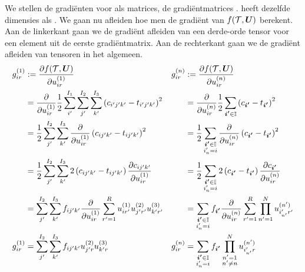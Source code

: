 We stellen de gradi\"enten voor als matrices, de gradi\"entmatrices \GGG{}. \GGG{} heeft dezelfde dimensies als \UUU{}. We gaan nu afleiden hoe men de gradi\"ent van $f(\mathcal{T}, \boldsymbol{U})$ berekent. Aan de linkerkant gaan we de gradi\"ent afleiden van een derde-orde tensor voor een element uit de eerste gradi\"entmatrix. Aan de rechterkant gaan we de gradi\"ent afleiden van tensoren in het algemeen.
\begin{align*}
	g^{(1)}_{ir} 	&:= \frac{\partial f(\T, \mUUU)}{\partial u^{(1)}_{ir}} &
    g^{(n)}_{ir} 	&:= \frac{\partial f(\T, \mUUU)}{\partial u^{(n)}_{ir}}\\
%    
					&=\frac{\partial}{\partial u^{(1)}_{ir}} \frac{1}{2}\sum_{i'}^{I_1}\sum_{j'}^{I_2}\sum_{k'}^{I_3}\left(c_{i'j'k'} - t_{i'j'k'} \right)^2 &
					&=\frac{\partial}{\partial u^{(n)}_{ir}} \frac{1}{2}\sum_{\iii{} \in \I}\left(c_{\iii{}} - t_{\iii{}} \right)^2\\
%					
					&= \frac{1}{2} \sum_{j'}^{I_2}\sum_{k'}^{I_3} \frac{\partial}{\partial u^{(1)}_{ir}} \left(c_{ij'k'} - t_{ij'k'} \right)^2 &
					&= \frac{1}{2} \sum_{\substack{\iii{} \in \I\\ i'_n = i}} \frac{\partial}{\partial u^{(n)}_{ir}} \left(c_{\iii{}} - t_{\iii{}} \right)^2\\
%					
					&= \frac{1}{2} \sum_{j'}^{I_2}\sum_{k'}^{I_3} 2 \left(c_{ij'k'} - t_{ij'k'} \right) \frac{\partial c_{ij'k'}}{\partial u^{(1)}_{ir}} &
					&= \frac{1}{2} \sum_{\substack{\iii{} \in \I\\ i'_n = i}} 2 \left(c_{\iii{}} - t_{\iii{}} \right) \frac{\partial c_{\iii{}}}{\partial u^{(n)}_{ir}}\\
%					
					&=\sum_{j'}^{I_2}\sum_{k'}^{I_3} f_{ij'k'} \frac{\partial}{\partial u^{(1)}_{ir}} \sum_{r'=1}^{R}  u^{(1)}_{ir'} u^{(2)}_{j'r'} u^{(3)}_{k'r'}&
					&=\sum_{\substack{\iii{} \in \I\\ i'_n = i}} f_{\iii{}} \frac{\partial}{\partial u^{(n)}_{ir}} \sum_{r'=1}^{R} \prod_{n'=1}^{N} u^{(n')}_{i'_{n'}r'}\\
%					
	g^{(1)}_{ir}	&=\sum_{j'}^{I_2}\sum_{k'}^{I_3} f_{ij'k'} u^{(2)}_{j'r} u^{(3)}_{k'r}&
	g^{(n)}_{ir}	&=\sum_{\substack{\iii{} \in \I\\ i'_n = i}} f_{\iii{}} \prod_{\substack{n'=1\\n'\neq n}}^{N} u^{(n')}_{i'_{n'}r}
\end{align*}